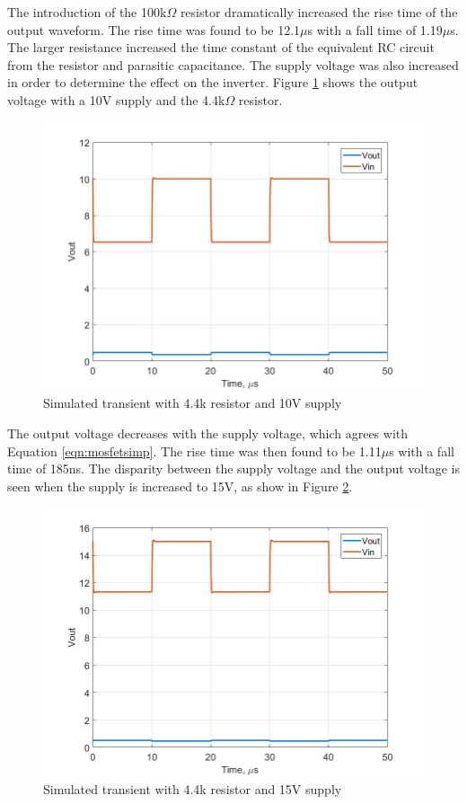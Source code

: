 The introduction of the 100k$\Omega$ resistor dramatically increased the rise time of the output waveform. The rise time was found to be 12.1$\mu$s with a fall time of 1.19$\mu$s. The larger resistance increased the time constant of the equivalent RC circuit from the resistor and parasitic capacitance. The supply voltage was also increased in order to determine the effect on the inverter. Figure \ref{fig:10vtran} shows the output voltage with a 10V supply and the 4.4k$\Omega$ resistor.

\begin{figure}[H]
    \centering
    \includegraphics[scale = .30]{CircuitDevelopment/NMOS/tran_4k_vdd_10.jpg}
    \caption{Simulated transient with 4.4k resistor and 10V supply}
    \label{fig:10vtran}
\end{figure}

The output voltage decreases with the supply voltage, which agrees with Equation \ref{eqn:mosfetsimp}. The rise time was then found to be 1.11$\mu$s with a fall time of 185ns. The disparity between the supply voltage and the output voltage is seen when the supply is increased to 15V, as show in Figure \ref{fig:15vtran}.


\begin{figure}[H]
    \centering
    \includegraphics[scale = .30]{CircuitDevelopment/NMOS/tran_4k_vdd_15.jpg}
    \caption{Simulated transient with 4.4k resistor and 15V supply}
    \label{fig:15vtran}
\end{figure}

